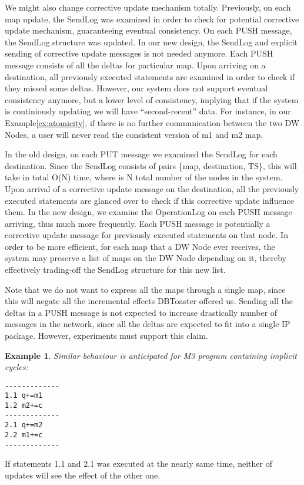 \documentclass{sig-semester}
\newtheorem{example}[theorem]{Example}
\begin{document}
We might also change corrective update mechanism totally. Previously, on each map update, the SendLog was examined in order to check for potential corrective update mechanism, guaranteeing eventual consistency. On each PUSH message, the SendLog structure was updated. In our new design, the SendLog and explicit sending of corrective update messages is not needed anymore. Each PUSH message consists of all the deltas for particular map. Upon arriving on a destination, all previously executed statements are examined in order to check if they missed some deltas. However, our system does not support eventual consistency anymore, but a lower level of consistency, implying that if the system is continiously updating we will have ``second-recent'' data. For instance, in our Example\ref{ex:atomicity}, if there is no further communication between the two DW Nodes, a user will never read the consistent version of m1 and m2 map.

In the old design, on each PUT message we examined the SendLog for each destination. Since the SendLog consists of pairs \{map, destination, TS\}, this will take in total O(N) time, where is N total number of the nodes in the system. Upon arrival of a corrective update message on the destination, all the previously executed statements are glanced over to check if this corrective update influence them. In the new design, we examine the OperationLog on each PUSH message arriving, thus much more frequently. Each PUSH message is potentially a corrective update message for previously executed statements on that node. In order to be more efficient, for each map that a DW Node ever receives, the system may preserve a list of maps on the DW Node depending on it, thereby effectively trading-off the SendLog structure for this new list.

Note that we do not want to express all the maps through a single map, since this will negate all the incremental effects DBToaster offered us. Sending all the deltas in a PUSH message is not expected to increase drastically number of messages in the network, since all the deltas are expected to fit into a single IP package. However, experiments must support this claim.

\begin{example} \em
\label{ex:M3Program}
Similar behaviour is anticipated for M3 program containing implicit cycles:
\begin{verbatim}
-------------
1.1 q+=m1
1.2 m2+=c
-------------
2.1 q+=m2
2.2 m1+=c
-------------
\end{verbatim}
\end{example}
If statements 1.1 and 2.1 was executed at the nearly same time, neither of updates will see the effect of the other one.
\end{document}
